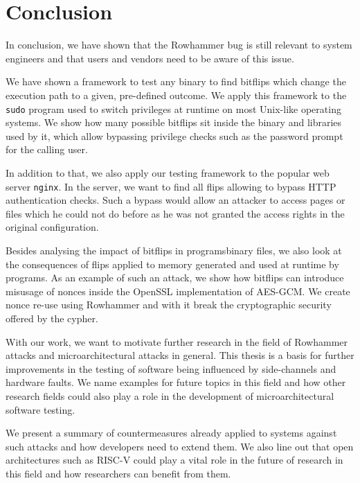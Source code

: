 \chapter{Conclusion}\label{sec:conclusion}

In conclusion, we have shown that the Rowhammer bug is still relevant to system
engineers and that users and vendors need to be aware of this issue.

We have shown a framework to test any binary to find bitflips which change the
execution path to a given, pre-defined outcome. We apply this framework to the
\texttt{sudo} program used to switch privileges at runtime on most Unix-like
operating systems. We show how many possible bitflips sit inside the binary and
libraries used by it, which allow bypassing privilege checks such as the
password prompt for the calling user.

In addition to that, we also apply our testing framework to the popular web
server \texttt{nginx}. In the server, we want to find all flips allowing to
bypass HTTP authentication checks. Such a bypass would allow an attacker to
access pages or files which he could not do before as he was not granted the
access rights in the original configuration.

Besides analysing the impact of bitflips in programs\textquotesingle binary
files, we also look at the consequences of flips applied to memory generated
and used at runtime by programs. As an example of such an attack, we show how
bitflips can introduce misusage of nonces inside the OpenSSL implementation of
AES-GCM. We create nonce re-use using Rowhammer and with it break the
cryptographic security offered by the cypher.

With our work, we want to motivate further research in the field of Rowhammer
attacks and microarchitectural attacks in general. This thesis is a basis for
further improvements in the testing of software being influenced by
side-channels and hardware faults. We name examples for future topics in this
field and how other research fields could also play a role in the development of
microarchitectural software testing.

We present a summary of countermeasures already applied to systems against such
attacks and how developers need to extend them. We also line out that open
architectures such as RISC-V could play a vital role in the future of research
in this field and how researchers can benefit from them.

